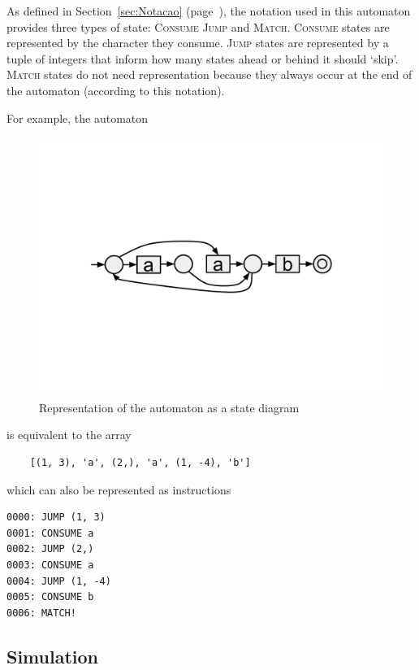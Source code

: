 \documentclass{llncs}
\begin{document}
As defined in Section~\ref {sec:Notacao} (page~\pageref {sec:Notacao}), the notation used in this automaton provides three types of state: \textsc{Consume} \textsc{Jump} and \textsc{Match}. \textsc{Consume} states are represented by the character they consume. \textsc{Jump} states are represented by a tuple of integers that inform how many states ahead or behind it should `skip'. \textsc{Match} states do not need representation because they always occur at the end of the automaton (according to this notation). 

For example, the automaton 

\begin{figure}[!htbp]
  \centering
  \includegraphics[trim=3.5in 4in 3.5in 4in, scale=0.3]{figures/pure_automaton.pdf}
  \caption{Representation of the automaton as a state diagram}
  \label{fig:exemplo_automato_puro}
\end{figure}

\noindent is equivalent to the array 

\begin{verbatim}
	[(1, 3), 'a', (2,), 'a', (1, -4), 'b']
\end{verbatim}

\noindent which can also be represented as instructions 

\begin{verbatim}
0000: JUMP (1, 3)
0001: CONSUME a
0002: JUMP (2,)
0003: CONSUME a
0004: JUMP (1, -4)
0005: CONSUME b
0006: MATCH!
\end{verbatim}


\subsection{Simulation}
\end{document}
